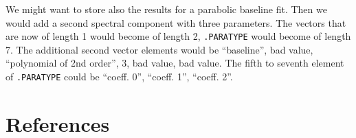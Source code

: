\begin{enumerate}
   We might want to store also the results for a parabolic baseline
   fit. Then we would add a second spectral component with three
   parameters. The vectors that are now of length 1 would become of
   length 2, {\tt .PARATYPE} would become of length 7. The additional
   second vector elements would be ``baseline'', bad value, ``polynomial
   of 2nd order'', 3, bad value, bad value. The fifth to seventh element
   of {\tt .PARATYPE} could be ``coeff. 0'', ``coeff. 1'', ``coeff. 2''.

\end{enumerate}


\appendix
\newpage
\section{\label{refer}References}

